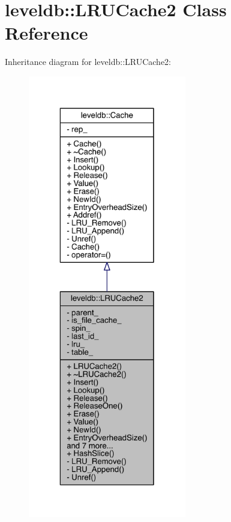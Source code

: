 \hypertarget{classleveldb_1_1_l_r_u_cache2}{}\section{leveldb\+:\+:L\+R\+U\+Cache2 Class Reference}
\label{classleveldb_1_1_l_r_u_cache2}


Inheritance diagram for leveldb\+:\+:L\+R\+U\+Cache2\+:\nopagebreak
\begin{figure}[H]
\begin{center}
\leavevmode
\includegraphics[height=550pt]{classleveldb_1_1_l_r_u_cache2__inherit__graph}
\end{center}
\end{figure}



